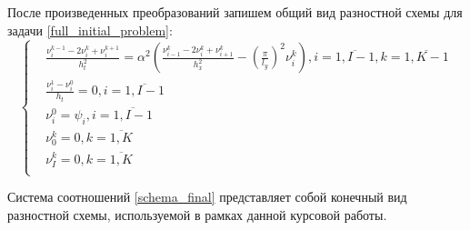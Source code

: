 {{			После произведенных преобразований запишем общий вид разностной схемы для задачи \eqref{full_initial_problem}:
			\begin{equation} \label{schema_final}
					\left\{
					\begin{split}
						&\frac{\nu^{k-1}_i - 2\nu^{k}_i + \nu^{k+1}_i}{h_t^2} = \alpha^2\left(\frac{\nu^{k}_{i-1} - 2\nu^{k}_i + \nu^{k}_{i+1}}{h_x^2} - \left(\frac{\pi}{l_y}\right)^2 \nu^{k}_i\right) ,  i =  \overline{ 1, I-1}, k =  \overline{ 1, K-1}\\
						& \frac{\nu^{1}_i - \nu^{0}_i}{h_t} = 0,  i = \overline{ 1, I-1} \\
						&\nu^0_{i} = \psi_i, i =  \overline{ 1, I-1}\\
						&\nu^k_{0} = 0, k =  \overline{1, K}\\
						&\nu^k_{I} = 0, k =  \overline{1, K}\\
					\end{split}
					\right.
				\end{equation}
			
			Система соотношений \eqref{schema_final} представляет собой конечный вид разностной схемы, используемой в рамках данной курсовой работы. 
	
	}
%		

}
